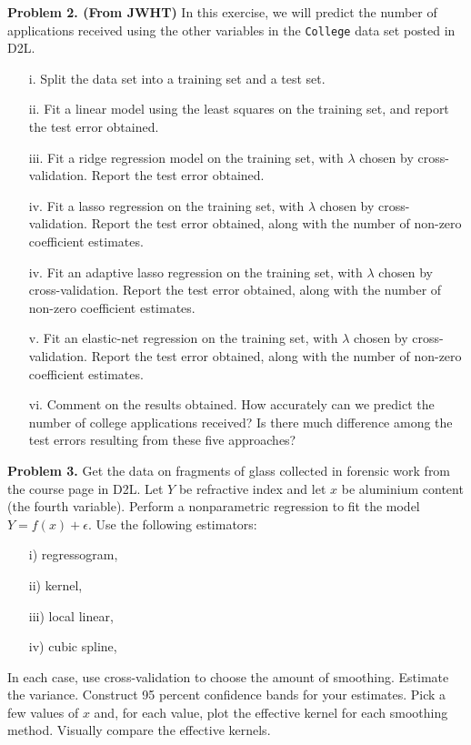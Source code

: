 \documentclass[11pt]{report}
\begin{document}
\noindent
{\bf Problem 2. (From JWHT)} In this exercise, we will predict the number of applications received using the other variables in the {\tt College} data set posted in D2L.
\begin{itemize}
\item[i. ] Split the data set into a training set and a test set.
\item[ii. ] Fit a linear model using the least squares on the training set, and report the test error obtained. 
\item[iii. ] Fit a ridge regression model on the training set, with $\lambda$ chosen by cross-validation. Report the test error obtained.
\item[iv. ] Fit a lasso regression on the training set, with $\lambda$ chosen by cross-validation. Report the test error obtained, along with the number of non-zero coefficient estimates.
\item[iv. ] Fit an adaptive lasso regression on the training set, with $\lambda$ chosen by cross-validation. Report the test error obtained, along with the number of non-zero coefficient estimates.
\item[v. ] Fit an elastic-net regression on the training set, with $\lambda$ chosen by cross-validation. Report the test error obtained, along with the number of non-zero coefficient estimates.
\item[vi. ]  Comment on the results obtained. How accurately can we predict the number of college applications received? Is there much difference among the test errors resulting from these five approaches?
\end{itemize} 

\vspace{1mm}
\noindent
{\bf Problem 3.}  Get the data on fragments of glass collected in forensic work from the course page in D2L. Let $Y$ be refractive index and let $x$ be aluminium content (the fourth variable). Perform a nonparametric regression to fit the model $Y=f(x)+\epsilon$. Use the following estimators:  
\begin{itemize}
\item[i) ] regressogram, 
\item[ii) ] kernel,
\item[iii) ] local linear,
\item[iv) ] cubic spline,
\end{itemize}
In each case, use cross-validation to choose the amount of smoothing. Estimate the variance. Construct 95 percent confidence bands for your estimates. Pick a few values of $x$ and, for each value, plot the effective kernel for each smoothing method. Visually compare the effective kernels. \\
\end{document}
